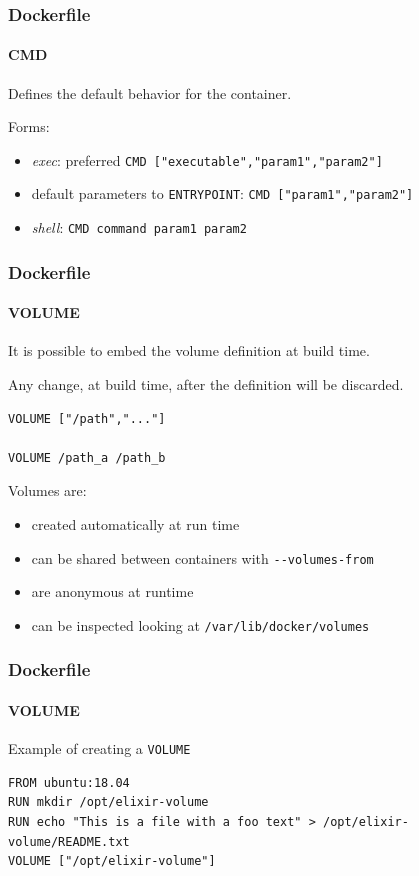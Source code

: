 \begin{frame}[fragile]
\frametitle{Dockerfile}
\framesubtitle{CMD}
Defines the default behavior for the container.

Forms:
\begin{itemize}
\item \textit{exec}: preferred \lstinline!CMD ["executable","param1","param2"]!
\item default parameters to \lstinline!ENTRYPOINT!: \lstinline!CMD ["param1","param2"]!
\item \textit{shell}: \lstinline!CMD command param1 param2!
\end{itemize}
\end{frame}

\begin{frame}[fragile]
\frametitle{Dockerfile}
\framesubtitle{VOLUME}
It is possible to embed the volume definition at build time.

Any change, at build time, after the definition will be discarded.

\begin{lstlisting}
VOLUME ["/path","..."]

VOLUME /path_a /path_b
\end{lstlisting}

Volumes are:
\begin{itemize}
\item created automatically at run time
\item can be shared between containers with \lstinline!--volumes-from!
\item are anonymous at runtime
\item can be inspected looking at \lstinline!/var/lib/docker/volumes!
\end{itemize}
\end{frame}

\begin{frame}[fragile]
\frametitle{Dockerfile}
\framesubtitle{VOLUME}

Example of creating a \lstinline!VOLUME!

\begin{lstlisting}[breaklines=true]
FROM ubuntu:18.04
RUN mkdir /opt/elixir-volume
RUN echo "This is a file with a foo text" > /opt/elixir-volume/README.txt
VOLUME ["/opt/elixir-volume"]
\end{lstlisting}
\end{frame}

